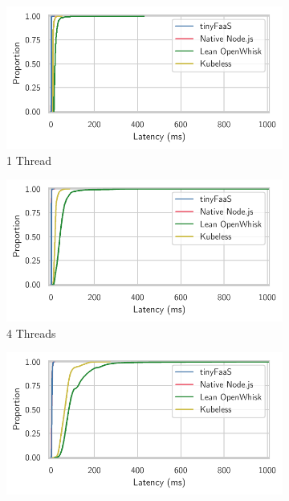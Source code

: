 \begin{figure}
    \begin{subfigure}{0.49\linewidth}
        \centering
        \includegraphics[width=\linewidth]{./fig/ecdf-aws-1.pdf}
        \caption{1 Thread}
        \label{fig:awsgraph:1}
    \end{subfigure}
    \hfill
    \begin{subfigure}{0.49\linewidth}
        \centering
        \includegraphics[width=\linewidth]{./fig/ecdf-aws-4.pdf}
        \caption{4 Threads}
        \label{fig:awsgraph:4}
    \end{subfigure}
    \vfill
    \begin{subfigure}{0.49\linewidth}
        \centering
        \includegraphics[width=\linewidth]{./fig/ecdf-aws-16.pdf}

\end{subfigure}
\end{figure}
